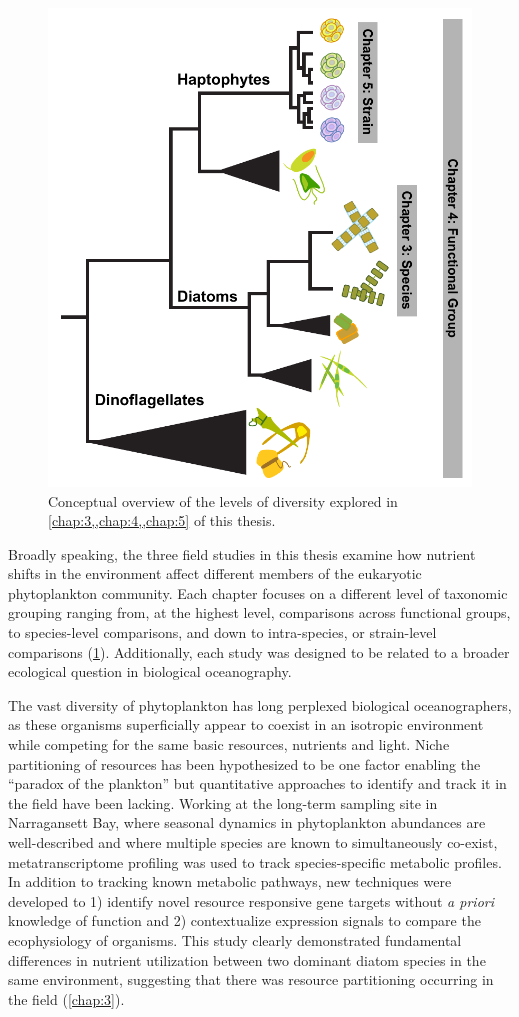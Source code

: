 \begin{figure}[t!]
  \centering
    \includegraphics[width=.75\textwidth]{Images/C1_ThesisDiagram.pdf}
    \caption{Conceptual overview of the levels of diversity explored in \cref{chap:3,,chap:4,,chap:5} of this thesis.}
  \label{fig:c1f1}
\end{figure}

Broadly speaking, the three field studies in this thesis examine how nutrient shifts in the environment affect different members of the eukaryotic phytoplankton community. Each chapter focuses on a different level of taxonomic grouping ranging from, at the highest level, comparisons across functional groups, to species-level comparisons, and down to intra-species, or strain-level comparisons (\cref{fig:c1f1}). Additionally, each study was designed to be related to a broader ecological question in biological oceanography. \par 

The vast diversity of phytoplankton has long perplexed biological oceanographers, as these organisms superficially appear to coexist in an isotropic environment while competing for the same basic resources, nutrients and light. Niche partitioning of resources has been hypothesized to be one factor enabling the ``paradox of the plankton'' \citep{Hutchinson1961} but quantitative approaches to identify and track it in the field have been lacking. Working at the long-term sampling site in Narragansett Bay, where seasonal dynamics in phytoplankton abundances are well-described and where multiple species are known to simultaneously co-exist, metatranscriptome profiling was used to track species-specific metabolic profiles. In addition to tracking known metabolic pathways, new techniques were developed to 1) identify novel resource responsive gene targets without \textit{a priori} knowledge of function and 2) contextualize expression signals to compare the ecophysiology of organisms. This study clearly demonstrated fundamental differences in nutrient utilization between two dominant diatom species in the same environment, suggesting that there was resource partitioning occurring in the field (\cref{chap:3}).\par 

